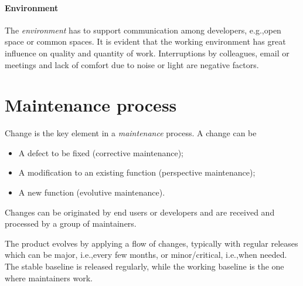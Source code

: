 \paragraph{Environment}
The \emph{environment} has to support communication among developers, e.g.,\@ open space or common spaces. It is evident that the working environment has great influence on quality and quantity of work. Interruptions by colleagues, email or meetings and lack of comfort due to noise or light are negative factors.

\section{Maintenance process}
Change is the key element in a \emph{maintenance} process. A change can be
\begin{itemize}
\item A defect to be fixed (corrective maintenance); \item A modification to an existing function (perspective maintenance);
\item A new function (evolutive maintenance).
\end{itemize}
Changes can be originated by end users or developers and are received and processed by a group of maintainers.

The product evolves by applying a flow of changes, typically with regular releases which can be major, i.e.,\@ every few months, or minor/critical, i.e.,\@ when needed. The stable baseline is released regularly, while the working baseline is the one where maintainers work.

